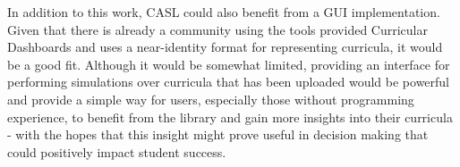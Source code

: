 \documentclass[botnum, fleqn]{unmeethesis}
\begin{document}
  In addition to this work, CASL could also benefit from a GUI implementation. Given that there is already a community using the tools provided Curricular Dashboards and uses a near-identity format for representing curricula, it would be a good fit. Although it would be somewhat limited, providing an interface for performing simulations over curricula that has been uploaded would be powerful and provide a simple way for users, especially those without programming experience, to benefit from the library and gain more insights into their curricula - with the hopes that this insight might prove useful in decision making that could positively impact student success.

\vspace{4\baselineskip}\vspace{-\parskip} %
\footnotesize %

\end{document}
